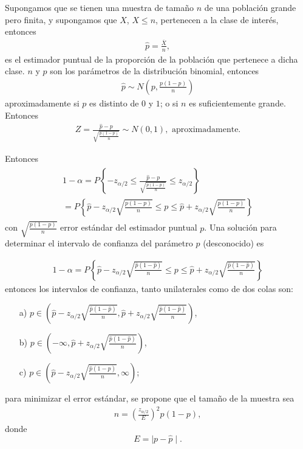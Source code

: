 \documentclass[a4paper]{report} %
\begin{document}
Supongamos que se tienen una muestra de tama\~no $n$ de una poblaci\'on grande pero finita, y supongamos que $X$, $X\leq n$, pertenecen a la clase de inter\'es, entonces \begin{eqnarray}\hat{p}=\frac{\overline{X}}{n},\end{eqnarray} es el estimador puntual de la proporci\'on de la poblaci\'on que pertenece a dicha clase. $n$ y $p$ son los par\'ametros de la distribuci\'on binomial, entonces \begin{eqnarray}\hat{p}\sim N\left(p,\frac{p\left(1-p\right)}{n}\right)\end{eqnarray} aproximadamente si $p$ es distinto de $0$ y $1$; o si $n$ es suficientemente grande. Entonces
\begin{eqnarray}
Z=\frac{\hat{p}-p}{\sqrt{\frac{p\left(1-p\right)}{n}}}\sim N\left(0,1\right),\textrm{ aproximadamente.}
\end{eqnarray}
 
Entonces
\begin{eqnarray}
\begin{array}{l}
1-\alpha=P\left\{-z_{\alpha/2}\leq\frac{\hat{p}-p}{\sqrt{\frac{p\left(1-p\right)}{n}}}\leq z_{\alpha/2}\right\}\\
=P\left\{\hat{p}-z_{\alpha/2}\sqrt{\frac{p\left(1-p\right)}{n}}\leq p\leq \hat{p}+z_{\alpha/2}\sqrt{\frac{p\left(1-p\right)}{n}}\right\}
\end{array}
\end{eqnarray}
con $\sqrt{\frac{p\left(1-p\right)}{n}}$ error est\'andar del estimador puntual $p$. Una soluci\'on para determinar el intervalo de confianza del par\'ametro $p$ (desconocido) es

\begin{eqnarray}
1-\alpha=P\left\{\hat{p}-z_{\alpha/2}\sqrt{\frac{\hat{p}\left(1-\hat{p}\right)}{n}}\leq p\leq \hat{p}+z_{\alpha/2}\sqrt{\frac{\hat{p}\left(1-\hat{p}\right)}{n}}\right\}
\end{eqnarray}
entonces los intervalos de confianza, tanto unilaterales como de dos colas son: 
\begin{itemize}
\item[a) ] $p\in \left(\hat{p}-z_{\alpha/2}\sqrt{\frac{\hat{p}\left(1-\hat{p}\right)}{n}},\hat{p}+z_{\alpha/2}\sqrt{\frac{\hat{p}\left(1-\hat{p}\right)}{n}}\right)$,

\item[b) ] $p\in \left(-\infty,\hat{p}+z_{\alpha/2}\sqrt{\frac{\hat{p}\left(1-\hat{p}\right)}{n}}\right)$,

\item[c) ] $p\in \left(\hat{p}-z_{\alpha/2}\sqrt{\frac{\hat{p}\left(1-\hat{p}\right)}{n}},\infty\right)$;

\end{itemize}
para minimizar el error est\'andar, se propone que el tama\~no de la muestra sea \begin{eqnarray}n= \left(\frac{z_{\alpha/2}}{E}\right)^{2}p\left(1-p\right),\end{eqnarray} donde $$E=\mid p-\hat{p}\mid.$$
\end{document}
